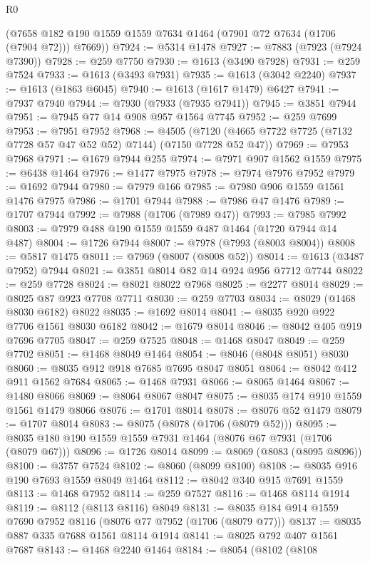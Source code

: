 \begin{lexlean}{R0}
\begin{coremodule}
      (@7658 @182 @190 @1559 @1559 @7634 @1464 (@7901 @72 @7634 (@1706 (@7904 @72))) @7669))
@7924 := @5314 @1478
@7927 := @7883 (@7923 (@7924 @7390))
@7928 := @259 @7750
@7930 := @1613 (@3490 @7928)
@7931 := @259 @7524
@7933 := @1613 (@3493 @7931)
@7935 := @1613 (@3042 @2240)
@7937 := @1613 (@1863 @6045)
@7940 := @1613 (@1617 @1479) @6427
@7941 := @7937 @7940
@7944 := @7930 (@7933 (@7935 @7941))
@7945 := @3851 @7944
@7951 := @7945 @77 @14 @908 @957 @1564 @7745
@7952 := @259 @7699
@7953 := @7951 @7952
@7968 := @4505 (@7120 (@4665 @7722 @7725 (@7132 @7728 @57 @47 @52 @52) @7144) (@7150 @7728 @52 @47))
@7969 := @7953 @7968
@7971 := @1679 @7944 @255
@7974 := @7971 @907 @1562 @1559
@7975 := @6438 @1464
@7976 := @1477 @7975
@7978 := @7974 @7976 @7952
@7979 := @1692 @7944
@7980 := @7979 @166
@7985 := @7980 @906 @1559 @1561 @1476 @7975
@7986 := @1701 @7944
@7988 := @7986 @47 @1476
@7989 := @1707 @7944
@7992 := @7988 (@1706 (@7989 @47))
@7993 := @7985 @7992
@8003 := @7979 @488 @190 @1559 @1559 @487 @1464 (@1720 @7944 @14 @487)
@8004 := @1726 @7944
@8007 := @7978 (@7993 (@8003 @8004))
@8008 := @5817 @1475
@8011 := @7969 (@8007 (@8008 @52))
@8014 := @1613 (@3487 @7952) @7944
@8021 := @3851 @8014 @82 @14 @924 @956 @7712 @7744
@8022 := @259 @7728
@8024 := @8021 @8022 @7968
@8025 := @2277 @8014
@8029 := @8025 @87 @923 @7708 @7711
@8030 := @259 @7703
@8034 := @8029 (@1468 @8030 @6182) @8022
@8035 := @1692 @8014
@8041 := @8035 @920 @922 @7706 @1561 @8030 @6182
@8042 := @1679 @8014
@8046 := @8042 @405 @919 @7696 @7705
@8047 := @259 @7525
@8048 := @1468 @8047
@8049 := @259 @7702
@8051 := @1468 @8049 @1464
@8054 := @8046 (@8048 @8051) @8030
@8060 := @8035 @912 @918 @7685 @7695 @8047 @8051
@8064 := @8042 @412 @911 @1562 @7684
@8065 := @1468 @7931
@8066 := @8065 @1464
@8067 := @1480 @8066
@8069 := @8064 @8067 @8047
@8075 := @8035 @174 @910 @1559 @1561 @1479 @8066
@8076 := @1701 @8014
@8078 := @8076 @52 @1479
@8079 := @1707 @8014
@8083 := @8075 (@8078 (@1706 (@8079 @52)))
@8095 := @8035 @180 @190 @1559 @1559 @7931 @1464 (@8076 @67 @7931 (@1706 (@8079 @67)))
@8096 := @1726 @8014
@8099 := @8069 (@8083 (@8095 @8096))
@8100 := @3757 @7524
@8102 := @8060 (@8099 @8100)
@8108 := @8035 @916 @190 @7693 @1559 @8049 @1464
@8112 := @8042 @340 @915 @7691 @1559
@8113 := @1468 @7952
@8114 := @259 @7527
@8116 := @1468 @8114 @1914
@8119 := @8112 (@8113 @8116) @8049
@8131 := @8035 @184 @914 @1559 @7690 @7952 @8116 (@8076 @77 @7952 (@1706 (@8079 @77)))
@8137 := @8035 @887 @335 @7688 @1561 @8114 @1914
@8141 := @8025 @792 @407 @1561 @7687
@8143 := @1468 @2240 @1464
@8184 := @8054
    (@8102
      (@8108

\end{coremodule}
\end{lexlean}
